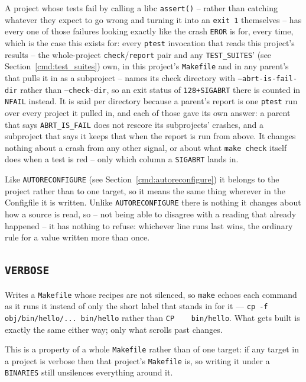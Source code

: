 \documentclass{article}
\begin{document}
A project whose tests fail by calling a libc \texttt{assert()} --
rather than catching whatever they expect to go wrong and turning it
into an \texttt{exit 1} themselves -- has every one of those failures
looking exactly like the crash \texttt{EROR} is for, every time,
which is the case this exists for: every \texttt{ptest} invocation
that reads this project's results -- the whole-project
\texttt{check}/\texttt{report} pair and any \texttt{TEST\_SUITES}' (see
Section~\ref{cmd:test_suites}) own, in this project's
\texttt{Makefile} and in any parent's that pulls it in as a
subproject -- names its check directory with
\texttt{--abrt-is-fail-dir} rather than \texttt{--check-dir}, so an
exit status of \texttt{128+SIGABRT} there is counted in \texttt{NFAIL}
instead.  It is said per directory because a parent's report is one
\texttt{ptest} run over every project it pulled in, and each of those
gave its own answer: a parent that says \texttt{ABRT\_IS\_FAIL} does
not rescore its subprojects' crashes, and a subproject that says it
keeps that when the report is run from above.  It changes nothing about a crash from any other signal, or
about what \texttt{make check} itself does when a test is red --
only which column a \texttt{SIGABRT} lands in.

Like \texttt{AUTORECONFIGURE} (see Section~\ref{cmd:autoreconfigure})
it belongs to the project rather than to one target, so it means the
same thing wherever in the Configfile it is written.  Unlike
\texttt{AUTORECONFIGURE} there is nothing it changes about how a
source is read, so -- not being able to disagree with a reading that
already happened -- it has nothing to refuse: whichever line runs
last wins, the ordinary rule for a value written more than once.

\subsection{\texttt{VERBOSE} \label{cmd:verbose}}

Writes a \texttt{Makefile} whose recipes are not silenced, so
\texttt{make} echoes each command as it runs it instead of only the
short label that stands in for it --- \texttt{cp -f obj/bin/hello/...
bin/hello} rather than \texttt{CP\ \ \ \ bin/hello}.  What gets built
is exactly the same either way; only what scrolls past changes.

This is a property of a whole \texttt{Makefile} rather than of one
target: if any target in a project is verbose then that project's
\texttt{Makefile} is, so writing it under a \texttt{BINARIES} still
unsilences everything around it.
\end{document}
